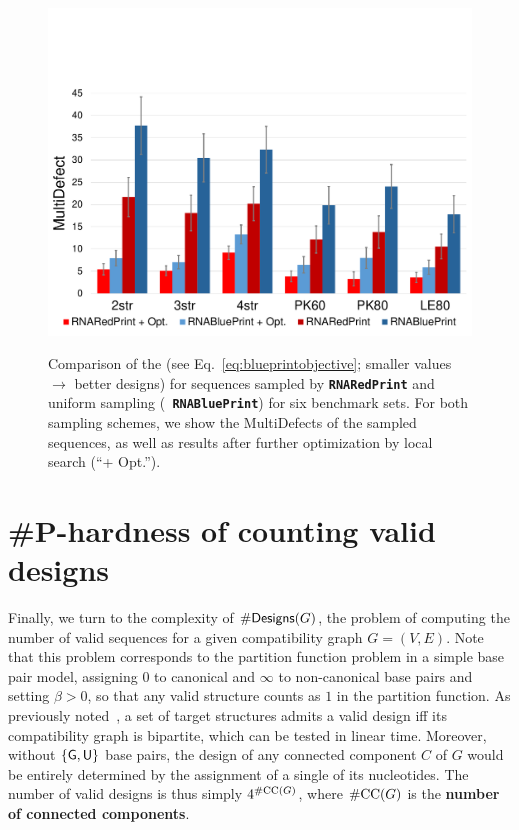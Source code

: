 \documentclass{bioinfo}
\newcommand{\real}{\mathbb{R}}
\newcommand{\Def}[1]{{\bfseries #1}}
\newcommand{\Obj}{\text{\rm MultiDefect}}
\newcommand{\NumDesign}{\ensuremath{\#}{\sf Designs}\xspace}
\newcommand{\Nuc}[1]{{\sf #1}}
\newcommand{\Gb}{\Nuc{G}}
\newcommand{\Ub}{\Nuc{U}}
\newcommand{\RNAblueprint}{{\tt \bfseries{}\color{black!85} RNA\textcolor{blue!70!black}{Blue}Print}}
\newcommand{\ourprog}{{\tt \bfseries{}\color{black!85}RNA\textcolor{red!70!black}{Red}Print}}
\begin{document}
\begin{figure}
  {\includegraphics[width=.9\linewidth,trim={.2cm .3cm .2cm 5cm},clip]{Figs/statistics-overall}}
  \caption{Comparison of the \Obj{} (see
    Eq.~\eqref{eq:blueprintobjective}; smaller values $\to$ better
    designs) for sequences sampled by \ourprog{} and uniform sampling
    (\RNAblueprint) for six benchmark sets. For both sampling schemes,
    we show the MultiDefects of the sampled sequences, as well as
    results after further optimization by local search (``+ Opt.'').}
\label{fig:benchmark-results}
\end{figure}

\section{\#{\sf P}-hardness of counting valid designs}\label{sec:counting}
Finally, we turn to the complexity of $\NumDesign(G)$, the problem of
computing the number of valid sequences for a given compatibility
graph $G=(V,E)$. Note that this problem corresponds to the partition
function problem in a simple base pair model, assigning $0$ to
canonical and $\infty$ to non-canonical base pairs and setting 
$\beta>0$, so that any valid structure counts as $1$ in the partition 
function. As previously noted~\citep{Flamm2001}, a set of target
structures admits a valid design iff its compatibility graph is
bipartite, which can be tested in linear time.  Moreover, without
$\{\Gb, \Ub\}$ base pairs, the design of any connected component $C$
of $G$ would be entirely determined by the assignment of a single of
its nucleotides. The number of valid designs is thus simply
$4^{\#{\rm CC}(G)}$, where $\#{\rm CC}(G)$ is the \Def{number of
  connected components}.
\end{document}
